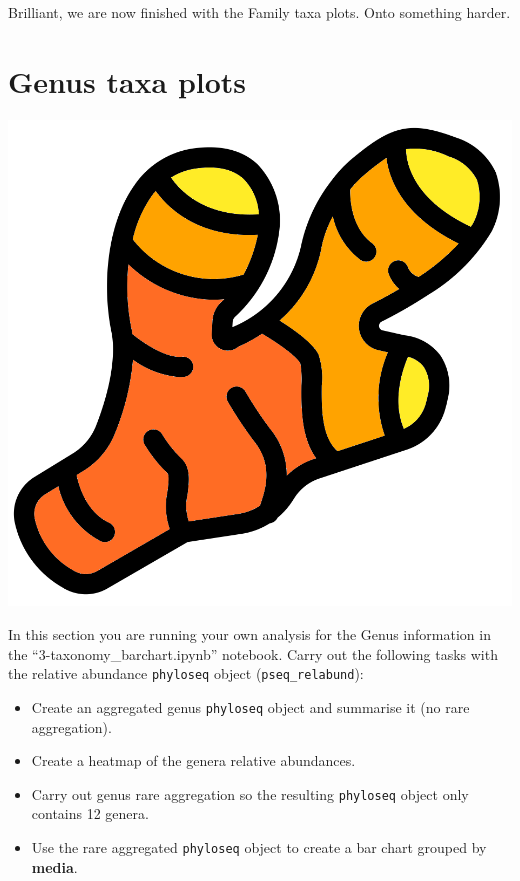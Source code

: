 \documentclass[
]{book}
\providecommand{\tightlist}{%
  \setlength{\itemsep}{0pt}\setlength{\parskip}{0pt}}
\begin{document}
Brilliant, we are now finished with the Family taxa plots. Onto something harder.

\hypertarget{genus-taxa-plots}{%
\section{Genus taxa plots}\label{genus-taxa-plots}}

\includegraphics{figures/ginger.png}

In this section you are running your own analysis for the Genus information in the ``3-taxonomy\_barchart.ipynb'' notebook.
Carry out the following tasks with the relative abundance \texttt{phyloseq} object (\texttt{pseq\_relabund}):

\begin{itemize}
\tightlist
\item
  Create an aggregated genus \texttt{phyloseq} object and summarise it (no rare aggregation).
\item
  Create a heatmap of the genera relative abundances.
\item
  Carry out genus rare aggregation so the resulting \texttt{phyloseq} object only contains 12 genera.
\item
  Use the rare aggregated \texttt{phyloseq} object to create a bar chart grouped by \textbf{media}.
\end{itemize}
\end{document}
